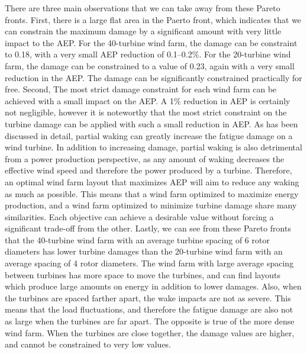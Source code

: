 \documentclass[11pt,letterpaper]{article}
\begin{document}
There are three main observations that we can take away from these Pareto fronts. First, there is a large flat area in the Paerto front, which indicates that we can constrain the maximum damage by a significant amount with very little impact to the AEP. For the 40-turbine wind farm, the damage can be constraint to 0.18, with a very small AEP reduction of 0.1--0.2\%. For the 20-turbine wind farm, the damage can be constrained to a value of 0.23, again with a very small reduction in the AEP. The damage can be significantly constrained practically for free. 
% 
Second, The most strict damage constraint for each wind farm can be achieved with a small impact on the AEP. A 1\% reduction in AEP is certainly not negligible, however it is noteworthy that the most strict constraint on the turbine damage can be applied with such a small reduction in AEP. As has been discussed in detail, partial waking can greatly increase the fatigue damage on a wind turbine. In addition to increasing damage, partial waking is also detrimental from a power production perspective, as any amount of waking decreases the effective wind speed and therefore the power produced by a turbine. Therefore, an optimal wind farm layout that maximizes AEP will aim to reduce any waking as much as possible. This means that a wind farm optimized to maximize energy production, and a wind farm optimized to minimize turbine damage share many similarities. Each objective can achieve a desirable value without forcing a significant trade-off from the other.
% 
Lastly, we can see from these Pareto fronts that the 40-turbine wind farm with an average turbine spacing of 6 rotor diameters has lower turbine damages than the 20-turbine wind farm with an average spacing of 4 rotor diameters. The wind farm with large average spacing between turbines has more space to move the turbines, and can find layouts which produce large amounts on energy in addition to lower damages. Also, when the turbines are spaced farther apart, the wake impacts are not as severe. This means that the load fluctuations, and therefore the fatigue damage are also not as large when the turbines are far apart. The opposite is true of the more dense wind farm. When the turbines are close together, the damage values are higher, and cannot be constrained to very low values.
\end{document}
